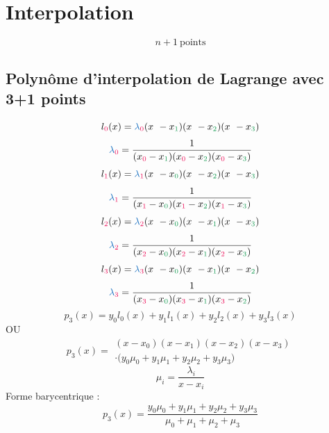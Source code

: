 \documentclass[resume]{subfiles}
\begin{document}
    \section{Interpolation}
    $$\boxed{n+1\ \text{points}}$$
    \subsection{Polynôme d'interpolation de Lagrange avec 3+1 points}
    $$l_{\textcolor{OrangeRed}{0}}(x)=\textcolor{RoyalBlue}{\lambda}_{\textcolor{OrangeRed}{0}}(x_{\ }-x_{\textcolor{ForestGreen}{1}})(x_{\ }-x_{\textcolor{ForestGreen}{2}})(x_{\ }-x_{\textcolor{ForestGreen}{3}})$$
    $$\textcolor{RoyalBlue}{\lambda}_{\textcolor{OrangeRed}{0}}=\frac{1}{(x_{\textcolor{OrangeRed}{0}}-x_{\textcolor{ForestGreen}{1}})(x_{\textcolor{OrangeRed}{0}}-x_{\textcolor{ForestGreen}{2}})(x_{\textcolor{OrangeRed}{0}}-x_{\textcolor{ForestGreen}{3}})}$$
    $$l_{\textcolor{OrangeRed}{1}}(x)=\textcolor{RoyalBlue}{\lambda}_{\textcolor{OrangeRed}{1}}(x_{\ }-x_{\textcolor{ForestGreen}{0}})(x_{\ }-x_{\textcolor{ForestGreen}{2}})(x_{\ }-x_{\textcolor{ForestGreen}{3}})$$
    $$\textcolor{RoyalBlue}{\lambda}_{\textcolor{OrangeRed}{1}}=\frac{1}{(x_{\textcolor{OrangeRed}{1}}-x_{\textcolor{ForestGreen}{0}})(x_{\textcolor{OrangeRed}{1}}-x_{\textcolor{ForestGreen}{2}})(x_{\textcolor{OrangeRed}{1}}-x_{\textcolor{ForestGreen}{3}})}$$
    $$l_{\textcolor{OrangeRed}{2}}(x)=\textcolor{RoyalBlue}{\lambda}_{\textcolor{OrangeRed}{2}}(x_{\ }-x_{\textcolor{ForestGreen}{0}})(x_{\ }-x_{\textcolor{ForestGreen}{1}})(x_{\ }-x_{\textcolor{ForestGreen}{3}})$$
    $$\textcolor{RoyalBlue}{\lambda}_{\textcolor{OrangeRed}{2}}=\frac{1}{(x_{\textcolor{OrangeRed}{2}}-x_{\textcolor{ForestGreen}{0}})(x_{\textcolor{OrangeRed}{2}}-x_{\textcolor{ForestGreen}{1}})(x_{\textcolor{OrangeRed}{2}}-x_{\textcolor{ForestGreen}{3}})}$$
    $$l_{\textcolor{OrangeRed}{3}}(x)=\textcolor{RoyalBlue}{\lambda}_{\textcolor{OrangeRed}{3}}(x_{\ }-x_{\textcolor{ForestGreen}{0}})(x_{\ }-x_{\textcolor{ForestGreen}{1}})(x_{\ }-x_{\textcolor{ForestGreen}{2}})$$
    $$\textcolor{RoyalBlue}{\lambda}_{\textcolor{OrangeRed}{3}}=\frac{1}{(x_{\textcolor{OrangeRed}{3}}-x_{\textcolor{ForestGreen}{0}})(x_{\textcolor{OrangeRed}{3}}-x_{\textcolor{ForestGreen}{1}})(x_{\textcolor{OrangeRed}{3}}-x_{\textcolor{ForestGreen}{2}})}$$
    $$\boxed{p_3(x)=y_0l_0(x)+y_1l_1(x)+y_2l_2(x)+y_3l_3(x)}$$
    OU
    $$\boxed{p_3(x)=\begin{split}(x-x_0)(x-x_1)(x-x_2)(x-x_3)\\ \cdot\big(y_0\mu_0+y_1\mu_1+y_2\mu_2+y_3\mu_3\big)\end{split}}$$
    $$\mu_i=\frac{\lambda_i}{x-x_i}$$
    Forme barycentrique :
    $$p_3(x)=\frac{y_0\mu_0+y_1\mu_1+y_2\mu_2+y_3\mu_3}{\mu_0+\mu_1+\mu_2+\mu_3}$$
\end{document}
